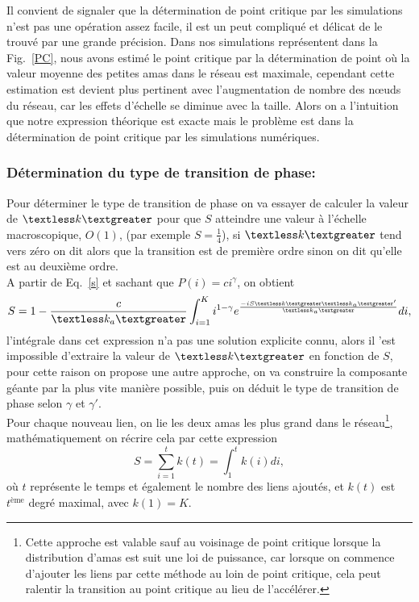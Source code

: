 Il convient de signaler que la détermination de point critique par les simulations n'est pas une opération assez facile, il est un peut compliqué et délicat de le trouvé par une grande précision. Dans nos simulations représentent dans la Fig.~\ref{PC}, nous avons estimé le point critique par la détermination de point où la valeur moyenne des petites amas dans le réseau est maximale,  cependant cette estimation est devient plus pertinent avec l'augmentation de nombre des nœuds du réseau, car les effets d'échelle se diminue avec la taille. Alors on a l'intuition que notre expression théorique est exacte mais le problème est dans la détermination de point critique par les simulations numériques. 
 
 
  \subsubsection{Détermination du type de transition de phase:}
 Pour déterminer le type de transition de phase on va essayer de calculer la valeur de $\km$ pour que $S$ atteindre une valeur à l'échelle macroscopique, $O(1)$, (par exemple $S=\frac{1}{4}$), si $\km$ tend vers zéro on dit alors que la transition est de première ordre sinon on dit qu'elle est au deuxième ordre.\\
 A partir de Eq.~\ref{s} et sachant que $P(i)=ci^{\gamma}$, on obtient
 \begin{equation}
 S=1-\frac{c}{\kma}\int_{i=1}^Ki^{1-\gamma}e^{\frac{-iS\km\kma'}{\kma}}di
 \label{s2},
 \end{equation}
 l'intégrale dans cet expression n'a pas une solution explicite connu, alors il 'est impossible d'extraire la valeur de $\km$ en fonction de $S$,  pour cette raison on propose une autre approche, on va construire la composante géante par la plus vite manière possible, puis on déduit le type de transition de phase selon $\gamma$ et $\gamma'$.\\
 Pour chaque nouveau lien, on lie les deux amas les plus grand dans le réseau\footnote{Cette approche est valable sauf au voisinage de point critique lorsque la distribution d'amas est suit une loi de puissance, car lorsque on commence d'ajouter les liens par cette méthode au loin de point critique, cela peut ralentir  la transition au point critique au lieu de l'accélérer.}, mathématiquement on récrire cela par cette expression 
  \begin{equation}
  S=\sum_{i=1}^tk(t)=\int_{1}^{t}k(i)di,
  \label{s3}
  \end{equation}
  où $t$ représente le temps et également le nombre des liens ajoutés, et $k(t)$ est $t^{\text{ème}}$ degré maximal, avec $k(1)=K$.\\
